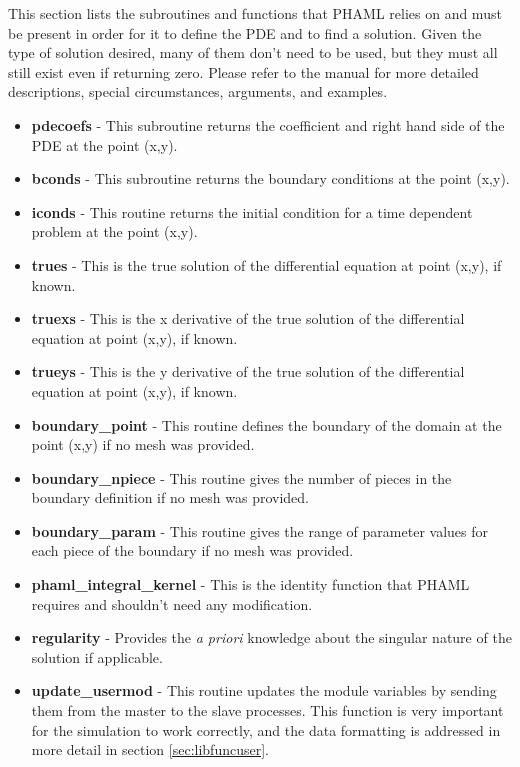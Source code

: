 This section lists the subroutines and functions that PHAML relies on and must be present in order for it to define the PDE and to find a solution.  Given the type of solution desired, many of them don't need to be used, but they must all still exist even if returning zero.  Please refer to the manual for more detailed descriptions, special circumstances, arguments, and examples.  \citep{phamldoc}

\begin{itemize}
\item \textbf{pdecoefs} - This subroutine returns the coefficient and right hand side of the PDE at the point (x,y). 
\item \textbf{bconds} - This subroutine returns the boundary conditions at the point (x,y).
\item \textbf{iconds} - This routine returns the initial condition for a time dependent problem at the point (x,y).
\item \textbf{trues} - This is the true solution of the differential equation at point (x,y), if known.
\item \textbf{truexs} - This is the x derivative of the true solution of the differential equation at point (x,y), if known.
\item \textbf{trueys} - This is the y derivative of the true solution of the differential equation at point (x,y), if known. 
\item \textbf{boundary\_point} -  This routine defines the boundary of the domain at the point (x,y) if no mesh was provided. 
\item \textbf{boundary\_npiece} - This routine gives the number of pieces in the boundary definition if no mesh was provided. 
\item \textbf{boundary\_param} - This routine gives the range of parameter values for each piece of the boundary if no mesh was provided.
\item \textbf{phaml\_integral\_kernel} - This is the identity function that PHAML requires and shouldn't need any modification.
\item \textbf{regularity} - Provides the \emph{a priori} knowledge about the singular nature of the solution if applicable.
\item \textbf{update\_usermod} - This routine updates the module variables by sending them from the master to the slave processes.  This function is very important for the simulation to work correctly, and the data formatting is addressed in more detail in section \ref{sec:libfuncuser}.

\end{itemize}

